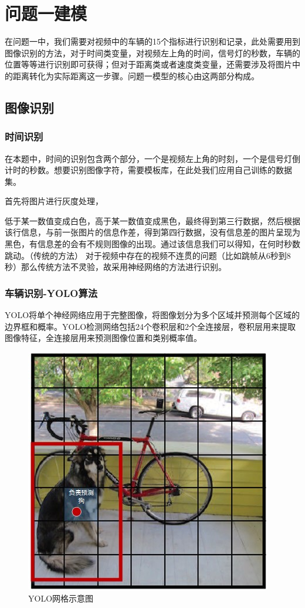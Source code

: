 \section{问题一建模}
在问题一中，我们需要对视频中的车辆的15个指标进行识别和记录，此处需要用到图像识别的方法，对于时间类变量，对视频左上角的时间，信号灯的秒数，车辆的位置等等进行识别即可获得；但对于距离类或者速度类变量，还需要涉及将图片中的距离转化为实际距离这一步骤。问题一模型的核心由这两部分构成。

\subsection{图像识别}

\subsubsection{时间识别}
在本题中，时间的识别包含两个部分，一个是视频左上角的时刻，一个是信号灯倒计时的秒数。想要识别图像字符，需要模板库，在此处我们应用自己训练的数据集。

首先将图片进行灰度处理，

低于某一数值变成白色，高于某一数值变成黑色，最终得到第三行数据，然后根据该行信息，与前一张图片的信息作差，得到第四行数据，没有信息差的图片呈现为黑色，有信息差的会有不规则图像的出现。通过该信息我们可以得知，在何时秒数跳动。（传统的方法）
对于视频中存在的视频不连贯的问题（比如跳帧从6秒到8秒）那么传统方法不灵验，故采用神经网络的方法进行识别。

\subsubsection{车辆识别-YOLO算法}

YOLO将单个神经网络应用于完整图像，将图像划分为多个区域并预测每个区域的边界框和概率。YOLO检测网络包括24个卷积层和2个全连接层，卷积层用来提取图像特征，全连接层用来预测图像位置和类别概率值。
\begin{figure}[h]
    \centering
    \includegraphics[scale=0.5]{figures/YOLO网格.png}
    \caption{YOLO网格示意图}
    \label{fig:YOLO}
\end{figure}

